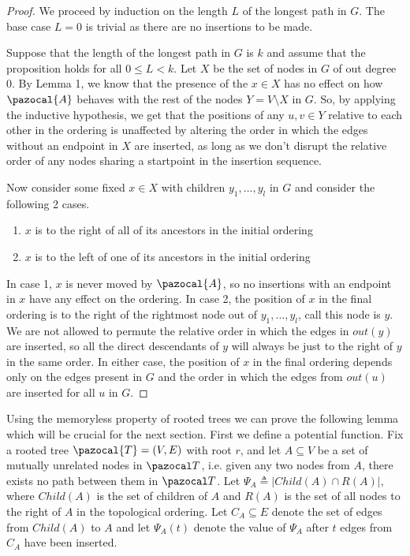 \documentclass{article}
\begin{document}
\begin{proof}
We proceed by induction on the length $L$ of the longest path in $G$. The base case $L=0$ is trivial as there are no insertions to be made.

Suppose that the length of the longest path in $G$ is $k$ and assume that the proposition holds for all $0 \leq L < k$. Let $X$ be the set of nodes in $G$ of out degree 0. By Lemma 1, we know that the presence of the $x \in X$ has no effect on how $\pazocal{A}$ behaves with the rest of the nodes $Y = V \setminus X$ in $G$. So, by applying the inductive hypothesis, we get that the positions of any $u,v \in Y$ relative to each other in the ordering is unaffected by altering the order in which the edges without an endpoint in $X$ are inserted, as long as we don't disrupt the relative order of any nodes sharing a startpoint in the insertion sequence.

Now consider some fixed $x \in X$ with children $y_1,...,y_l$ in $G$ and consider the following 2 cases.

\begin{enumerate}
    \item $x$ is to the right of all of its ancestors in the initial ordering
    \item $x$ is to the left of one of its ancestors in the initial ordering
\end{enumerate}

In case 1, $x$ is never moved by $\pazocal{A}$, so no insertions with an endpoint in $x$ have any effect on the ordering. In case 2, the position of $x$ in the final ordering is to the right of the rightmost node out of $y_1,...,y_l$, call this node is $y$. We are not allowed to permute the relative order in which the edges in $out(y)$ are inserted, so all the direct descendants of $y$ will always be just to the right of $y$ in the same order. In either case, the position of $x$ in the final ordering depends only on the edges present in $G$ and the order in which the edges from $out(u)$ are inserted for all $u$ in $G$.
\end{proof}

Using the memoryless property of rooted trees we can prove the following lemma which will be crucial for the next section. First we define a potential function. Fix a rooted tree $\pazocal{T} = (V,E)$ with root $r$, and let $A \subseteq V$ be a set of mutually unrelated nodes in $\pazocal T$, i.e. given any two nodes from $A$, there exists no path between them in $\pazocal T$. Let $\Psi_A \triangleq \vert Child(A) \cap R(A) \vert$, where $Child(A)$ is the set of children of $A$ and $R(A)$ is the set of all nodes to the right of $A$ in the topological ordering. Let $C_A \subseteq E$ denote the set of edges from $Child(A)$ to $A$ and let $\Psi_A(t)$ denote the value of $\Psi_A$ after $t$ edges from $C_A$ have been inserted.
\end{document}
